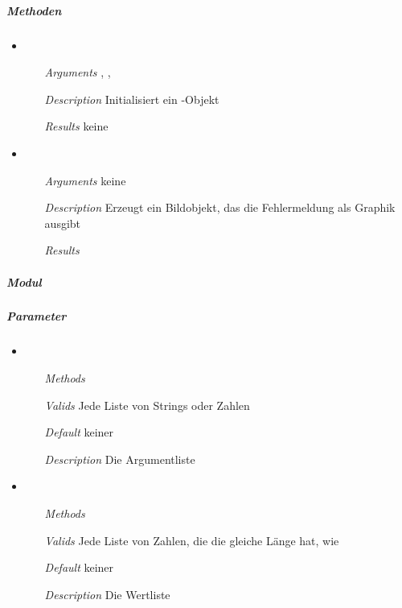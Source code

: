 
\newpage

\subparagraph{Methoden}
\begin{itemize}
\item {}
\begin{enumerate}
\item[\textit{Arguments}] , ,
\item[\textit{Description}] Initialisiert ein -Objekt
\item[\textit{Results}] keine
\end{enumerate}

\item {}
\begin{enumerate}
\item[\textit{Arguments}] keine
\item[\textit{Description}] Erzeugt ein Bildobjekt, das die
Fehlermeldung als Graphik ausgibt
\item[\textit{Results}]
\end{enumerate}

\end{itemize}


\newpage

\paragraph{}
\subparagraph{Modul} 


\subparagraph{Parameter} 
\begin{itemize}

\item {}
\begin{enumerate}
\item[\textit{Methods}] 
\item[\textit{Valids}] Jede Liste von Strings oder Zahlen
\item[\textit{Default}] keiner
\item[\textit{Description}] Die Argumentliste
\end{enumerate}

\item {}
\begin{enumerate}
\item[\textit{Methods}] 
\item[\textit{Valids}] Jede Liste von Zahlen, die die 
gleiche L\"ange hat, wie 
\item[\textit{Default}] keiner
\item[\textit{Description}] Die Wertliste
\end{enumerate}

\end{itemize}

